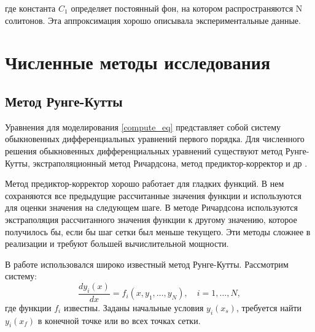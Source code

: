 где константа $C_1$ определяет постоянный фон, на котором распространяются N солитонов. Эта аппроксимация хорошо описывала экспериментальные данные.

\section{Численные методы исследования}

\subsection{Метод Рунге-Кутты}
Уравнения для моделирования \eqref{compute_eq} представляет собой систему обыкновенных дифференциальных уравнений первого порядка. Для численного решения обыкновенных дифференциальных уравнений существуют метод Рунге-Кутты, экстраполяционный метод Ричардсона, метод предиктор-корректор и др \cite{Press2002}.

Метод предиктор-корректор хорошо работает для гладких функций. В нем сохраняются все предыдущие рассчитанные значения функции и используются для оценки значения на следующем шаге. В методе Ричардсона используются экстраполяция рассчитанного значения функции к другому значению, которое получилось бы, если бы шаг сетки был меньше текущего. Эти методы сложнее в реализации и требуют большей вычислительной мощности.

В работе использовался широко известный метод Рунге-Кутты. Рассмотрим систему:
%
\begin{equation}
\frac{dy_i(x)}{dx}=f_i(x,y_1,\dots,y_N),\quad i=1,\dots,N,
\end{equation}
%
где функции $f_i$ известны. Заданы начальные условия $y_i(x_s)$, требуется найти $y_i(x_f)$ в конечной точке или во всех точках сетки.

